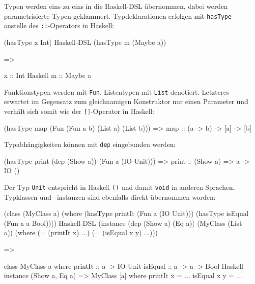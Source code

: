 \documentclass[12pt, a4paper, bibgerm]{scrbook}
\newenvironment{DIFnomarkup}{}{}
\newcommand\icode[1]{\lstinline?#1?}
\begin{document}
Typen werden eins zu eins in die Haskell-DSL übernommen, dabei werden
parametrisierte Typen geklammert. Typdeklarationen erfolgen mit
\icode{hasType} anstelle des \icode{::}-Operators in Haskell:
\begin{DIFnomarkup}\begin{code}
(hasType x Int)
                                      Haskell-DSL
(hasType m (Maybe a))

=>

x :: Int
                                      Haskell
m :: Maybe a
\end{code}\end{DIFnomarkup}
Funktionstypen werden mit \icode{Fun}, Listentypen mit \icode{List}
denotiert. Letzteres erwartet im Gegensatz zum gleichnamigen
Konstruktor nur einen Parameter und verhält sich somit wie der
\icode{[]}-Operator in Haskell:
\begin{DIFnomarkup}\begin{code}
(hasType map (Fun (Fun a b) (List a) (List b)))
=>
map :: (a -> b) -> [a] -> [b]                  
\end{code}\end{DIFnomarkup}
Typabhängigkeiten können mit \icode{dep} eingebunden werden:
\begin{DIFnomarkup}\begin{code}
(hasType print (dep (Show a)) (Fun a (IO Unit)))
=>
print :: (Show a) => a -> IO ()
\end{code}\end{DIFnomarkup}
Der Typ \icode{Unit} entspricht in Haskell \icode{()} und damit \icode{void}
in anderen Sprachen. Typklassen und --instanzen sind ebenfalls direkt
übernommen worden:
\begin{DIFnomarkup}\begin{code}
(class 
  (MyClass a)
  (where
    (hasType printIt (Fun a (IO Unit)))
    (hasType isEqual (Fun a a Bool))))
                                                     Haskell-DSL
(instance (dep (Show a) (Eq a))
  (MyClass (List a))
  (where
    (= (printIt x)   ...)
    (= (isEqual x y) ...)))

=>

class MyClass a
  where
    printIt :: a -> IO Unit
    isEqual :: a -> a -> Bool
                                                     Haskell
instance (Show a, Eq a) => MyClass [a]
  where
    printIt x   = ...
    isEqual x y = ...
\end{code}\end{DIFnomarkup}
\end{document}

